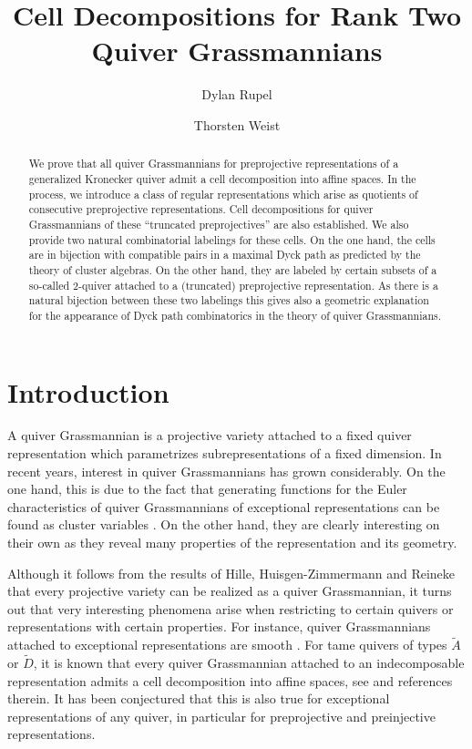 \documentclass{amsart}
\title{Cell Decompositions for Rank Two Quiver Grassmannians}
\author{Dylan Rupel}
\author{Thorsten Weist}
\numberwithin{equation}{section}
\begin{document}
\begin{abstract}
  We prove that all quiver Grassmannians for preprojective representations of a generalized Kronecker quiver admit a cell decomposition into affine spaces.  
  In the process, we introduce a class of regular representations which arise as quotients of consecutive preprojective representations.
  Cell decompositions for quiver Grassmannians of these ``truncated preprojectives'' are also established. 
  We also provide two natural combinatorial labelings for these cells.
  On the one hand, the cells are in bijection with compatible pairs in a maximal Dyck path as predicted by the theory of cluster algebras.
  On the other hand, they are labeled by certain subsets of a so-called $2$-quiver attached to a (truncated) preprojective representation.
  As there is a natural bijection between these two labelings this gives also a geometric explanation for the appearance of Dyck path combinatorics in the theory of quiver Grassmannians. 
\end{abstract}

\setcounter{tocdepth}{2}

\maketitle

\tableofcontents
\section{Introduction}
\noindent A quiver Grassmannian is a projective variety attached to a fixed quiver representation which parametrizes subrepresentations of a fixed dimension.
In recent years, interest in quiver Grassmannians has grown considerably.
On the one hand, this is due to the fact that generating functions for the Euler characteristics of quiver Grassmannians of exceptional representations can be found as cluster variables \cite{ck}.
On the other hand, they are clearly interesting on their own as they reveal many properties of the representation and its geometry.

Although it follows from the results of Hille, Huisgen-Zimmermann and Reineke that every projective variety can be realized as a quiver Grassmannian, 
it turns out that very interesting phenomena arise when restricting to certain quivers or representations with certain properties.
For instance, quiver Grassmannians attached to exceptional representations are smooth \cite{cr}.
For tame quivers of types $\tilde A$ or $\tilde D$, it is known that every quiver Grassmannian attached to an indecomposable representation admits a cell decomposition into affine spaces, see \cite{ce,lw} and references therein.
It has been conjectured that this is also true for exceptional representations of any quiver, in particular for preprojective and preinjective representations. 
\end{document}
